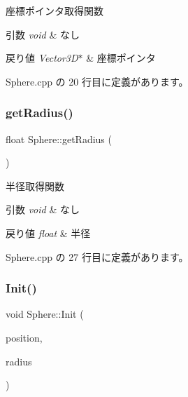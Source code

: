 座標ポインタ取得関数 


\begin{DoxyParams}{引数}
{\em void} & なし \\
\hline
\end{DoxyParams}

\begin{DoxyRetVals}{戻り値}
{\em Vector3\+D$\ast$} & 座標ポインタ \\
\hline
\end{DoxyRetVals}


 Sphere.\+cpp の 20 行目に定義があります。

\mbox{\label{class_sphere_a330dd34c7c7b6dfff106c4c71ec80028}} 
\subsubsection{\texorpdfstring{get\+Radius()}{getRadius()}}
{\footnotesize\ttfamily float Sphere\+::get\+Radius (\begin{DoxyParamCaption}{ }\end{DoxyParamCaption})}



半径取得関数 


\begin{DoxyParams}{引数}
{\em void} & なし \\
\hline
\end{DoxyParams}

\begin{DoxyRetVals}{戻り値}
{\em float} & 半径 \\
\hline
\end{DoxyRetVals}


 Sphere.\+cpp の 27 行目に定義があります。

\mbox{\label{class_sphere_aa0c93894c5dad170bd65f1cec3493c37}} 
\subsubsection{\texorpdfstring{Init()}{Init()}}
{\footnotesize\ttfamily void Sphere\+::\+Init (\begin{DoxyParamCaption}\item[{\mbox{\hyperlink{class_vector3_d}{Vector3D}}}]{position,  }\item[{float}]{radius }\end{DoxyParamCaption})}



